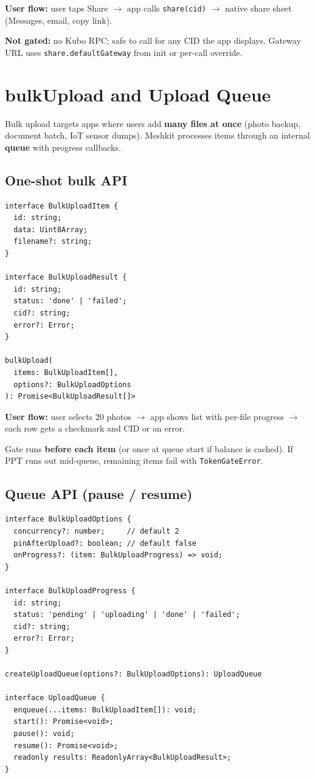 \documentclass[11pt,a4paper,openany]{report}
\begin{document}
\textbf{User flow:} user taps Share $\rightarrow$ app calls \texttt{share(cid)} $\rightarrow$ native share sheet (Messages, email, copy link).

\textbf{Not gated:} no Kubo RPC; safe to call for any CID the app displays. Gateway URL uses \texttt{share.defaultGateway} from init or per-call override.

\section{bulkUpload and Upload Queue}

Bulk upload targets apps where users add \textbf{many files at once} (photo backup, document batch, IoT sensor dumps). Meshkit processes items through an internal \textbf{queue} with progress callbacks.

\subsection{One-shot bulk API}

\begin{lstlisting}
interface BulkUploadItem {
  id: string;
  data: Uint8Array;
  filename?: string;
}

interface BulkUploadResult {
  id: string;
  status: 'done' | 'failed';
  cid?: string;
  error?: Error;
}

bulkUpload(
  items: BulkUploadItem[],
  options?: BulkUploadOptions
): Promise<BulkUploadResult[]>
\end{lstlisting}

\textbf{User flow:} user selects 20 photos $\rightarrow$ app shows list with per-file progress $\rightarrow$ each row gets a checkmark and CID or an error.

Gate runs \textbf{before each item} (or once at queue start if balance is cached). If PPT runs out mid-queue, remaining items fail with \texttt{TokenGateError}.

\subsection{Queue API (pause / resume)}

\begin{lstlisting}
interface BulkUploadOptions {
  concurrency?: number;     // default 2
  pinAfterUpload?: boolean; // default false
  onProgress?: (item: BulkUploadProgress) => void;
}

interface BulkUploadProgress {
  id: string;
  status: 'pending' | 'uploading' | 'done' | 'failed';
  cid?: string;
  error?: Error;
}

createUploadQueue(options?: BulkUploadOptions): UploadQueue

interface UploadQueue {
  enqueue(...items: BulkUploadItem[]): void;
  start(): Promise<void>;
  pause(): void;
  resume(): Promise<void>;
  readonly results: ReadonlyArray<BulkUploadResult>;
}
\end{lstlisting}
\end{document}

